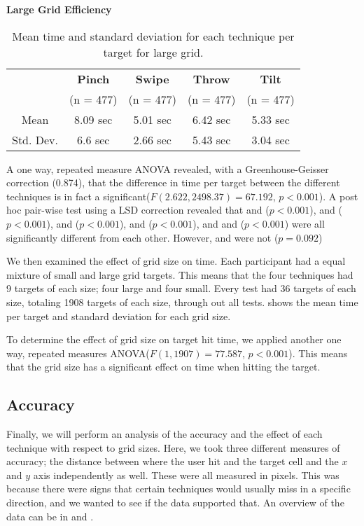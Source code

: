 \begin{table}[H]
	\centering
	\textbf{Large Grid Efficiency}\\[4pt]
	\begin{tabular}{|c|c|c|c|c|}
		\hline
		\rowcolor[HTML]{9B9B9B} 
		 & \textbf{Pinch} & \textbf{Swipe} & \textbf{Throw} & \textbf{Tilt} \\
		 \rowcolor[HTML]{9B9B9B}
		 & (n = 477) & (n = 477) & (n = 477) & (n = 477) \\ \hline
		Mean & 8.09  sec         & 5.01 sec          & 6.42 sec          & 5.33 sec         \\ \hline
		Std. Dev. & 6.6 sec & 2.66 sec & 5.43 sec & 3.04 sec \\ \hline
	\end{tabular}
	\caption{Mean time and standard deviation for each technique per target for large grid.}
	\label{tab:meanTimesTechniqueLarge}
\end{table}

A one way, repeated measure ANOVA revealed, with a Greenhouse-Geisser correction (0.874), that the difference in time per target between the different techniques is in fact a significant($F(2.622, 2498.37)=67.192$, $p<0.001$). A post hoc pair-wise test using a LSD correction revealed that \pinch and \swipe($p<0.001$), \pinch and \tilt ($p<0.001$), \pinch and \throw ($p<0.001$), \swipe and \throw ($p<0.001$), and \throw and \tilt ($p<0.001$) were all significantly different from each other. However, \swipe and \tilt were not ($p=0.092$)

We then examined the effect of grid size on time. Each participant had a equal mixture of small and large grid targets. This means that the four techniques had 9 targets of each size; four large and four small. Every test had 36 targets of each size, totaling 1908 targets of each size, through out all tests.  shows the mean time per target and standard deviation for each grid size. 

To determine the effect of grid size on target hit time, we applied another one way, repeated measures ANOVA($F(1,1907) = 77.587$, $p<0.001$). This means that the grid size has a significant effect on time when hitting the target. 

\subsection{Accuracy}
Finally, we will perform an analysis of the accuracy and the effect of each technique with respect to grid sizes.
Here, we took three different measures of accuracy; the distance between where the user hit and the target cell and the $x$ and $y$ axis independently as well. 
These were all measured in pixels.
This was because there were signs that certain techniques would usually miss in a specific direction, and we wanted to see if the data supported that. 
An overview of the data can be in  and .

